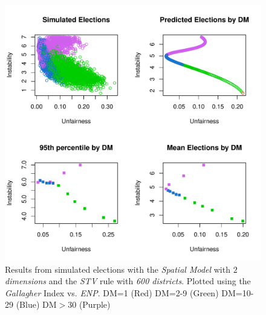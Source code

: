 \documentclass{article}
\begin{document}
\begin{figure}[]
\includegraphics[scale=1.00]{images/stv_spatial2_gallagher_enp.pdf}
\caption{Results from simulated elections with the \emph{Spatial Model} with \emph{$2$ dimensions} and the \emph{STV} rule with \emph{600 districts}. Plotted using the \emph{Gallagher} Index vs. \emph{ENP}. DM=1 (Red) DM=2-9 (Green) DM=10-29 (Blue) DM$>$30 (Purple)}
\label{fig:stv_spatial2large}
\end{figure}
\end{document}
